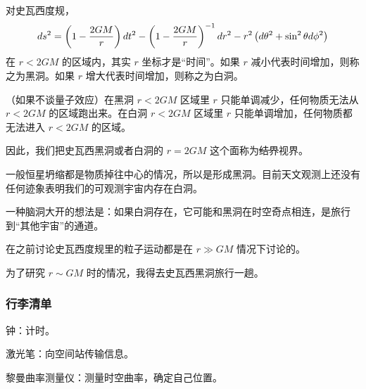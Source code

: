 \documentclass[CJK,13pt]{beamer}
\date{}
\begin{document}
  \bch


  \begin{frame}
    对史瓦西度规，
    $$ds^2 = \left(1-\frac{2GM}{r}\right)dt^2 - \left(1-\frac{2GM}{r}\right)^{-1} dr^2 - r^2\left(d\theta^2 + \sin^2\theta d\phi^2\right) $$
    在 $r<2GM$ 的区域内，其实 $r$ 坐标才是“时间”。如果 $r$ 减小代表时间增加，则称之为黑洞。如果 $r$  增大代表时间增加，则称之为白洞。

    \skipline

    （如果不谈量子效应）在黑洞 $r<2GM$ 区域里 $r$ 只能单调减少，任何物质无法从 $r<2GM$ 的区域跑出来。在白洞 $r<2GM$ 区域里 $r$ 只能单调增加，任何物质都无法进入 $r<2GM$ 的区域。

    \skipline

    因此，我们把史瓦西黑洞或者白洞的 {\blue $r=2GM$ }这个面称为\sout{结界}{\blue 视界}。  
  \end{frame}


  \begin{frame}
    一般恒星坍缩都是物质掉往中心的情况，所以是形成黑洞。目前天文观测上还没有任何迹象表明我们的可观测宇宙内存在白洞。


    一种脑洞大开的想法是：如果白洞存在，它可能和黑洞在时空奇点相连，是旅行到“其他宇宙”的通道。
  \end{frame}


  
  \begin{frame}
    在之前讨论史瓦西度规里的粒子运动都是在 $r\gg GM$ 情况下讨论的。


    为了研究 $r\sim GM$ 时的情况，我得去史瓦西黑洞旅行一趟。    
    
  \end{frame}


  \begin{frame}
    \frametitle{行李清单}
    \bitem
  \item[]{
    
  }
  \item[]{    
  }
  \item[]{    
  }
    \eitem
    \emini
    \bitem
  \item{钟：计时。    \vspace{0.6in}
  }
  \item{激光笔：向空间站传输信息。\vspace{0.6in}}
  \item{黎曼曲率测量仪：测量时空曲率，确定自己位置。}
    \eitem
    \emini
  \end{frame}
\end{document}
